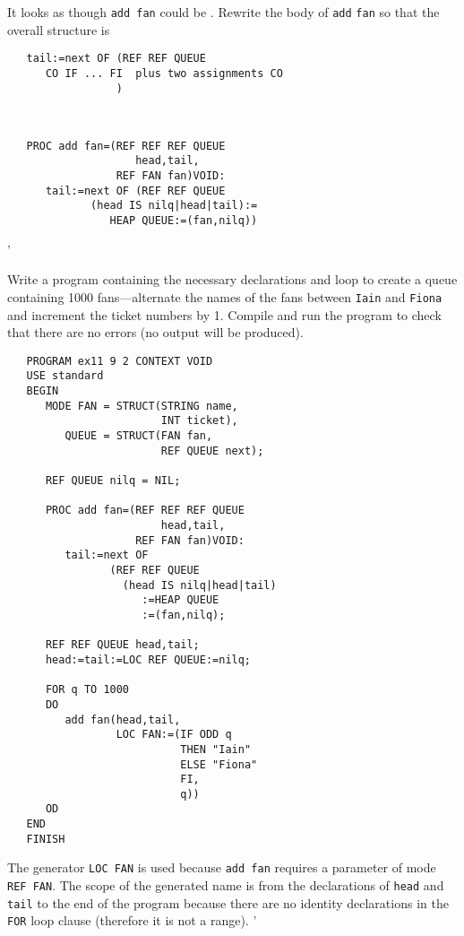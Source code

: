 \begin{exercise}
\item It looks as though \verb|add fan| could be
. Re\-write the body of \verb|add|
\verb|fan| so that the overall structure is
\begin{verbatim}
   tail:=next OF (REF REF QUEUE
      CO IF ... FI  plus two assignments CO
                 )
\end{verbatim}
\indent \ans \ %
\begin{verbatim}
   PROC add fan=(REF REF REF QUEUE
                    head,tail,
                 REF FAN fan)VOID:
      tail:=next OF (REF REF QUEUE
             (head IS nilq|head|tail):=
                HEAP QUEUE:=(fan,nilq))
\end{verbatim}
'
\item Write a program containing the necessary declarations and loop to
create a queue containing 1000 fans---alternate the names of the fans
between \verb|Iain| and \verb|Fiona| and increment the ticket
numbers by 1. Compile and run the program to check that there are no
errors (no output will be produced). \ans \ %
\begin{verbatim}
   PROGRAM ex11 9 2 CONTEXT VOID
   USE standard
   BEGIN
      MODE FAN = STRUCT(STRING name,
                        INT ticket),
         QUEUE = STRUCT(FAN fan,
                        REF QUEUE next);

      REF QUEUE nilq = NIL;

      PROC add fan=(REF REF REF QUEUE
                        head,tail,
                    REF FAN fan)VOID:
         tail:=next OF
                (REF REF QUEUE
                  (head IS nilq|head|tail)
                     :=HEAP QUEUE
                     :=(fan,nilq);

      REF REF QUEUE head,tail;
      head:=tail:=LOC REF QUEUE:=nilq;

      FOR q TO 1000
      DO
         add fan(head,tail,
                 LOC FAN:=(IF ODD q
                           THEN "Iain"
                           ELSE "Fiona"
                           FI,
                           q))
      OD
   END
   FINISH
\end{verbatim}
\noindent The generator \verb|LOC FAN| is used because \verb|add fan|
requires a parameter of mode \verb|REF FAN|. The scope of the
generated name is from the declarations of \verb|head| and
\verb|tail| to the end of the program because there are no identity
declarations in the \verb|FOR| loop clause (therefore it is not a
range).
'
\end{exercise}

